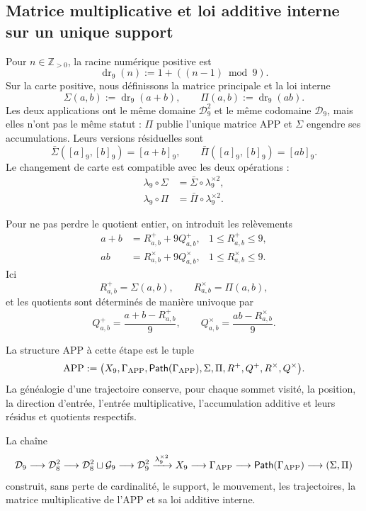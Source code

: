 \subsection{Matrice multiplicative et loi additive interne sur un unique support}

Pour \(n\in\mathbb Z_{>0}\), la racine numérique positive est
\[
 \operatorname{dr}_9(n):=1+((n-1)\bmod9).
\]
Sur la carte positive, nous définissons la matrice principale et la loi interne
\[
 \Sigma(a,b):=\operatorname{dr}_9(a+b),
 \qquad
 \Pi(a,b):=\operatorname{dr}_9(ab).
\]
Les deux applications ont le même domaine \(\mathcal D_9^2\) et le même
codomaine \(\mathcal D_9\), mais elles n’ont pas le même statut : \(\Pi\) publie
l’unique matrice APP et \(\Sigma\) engendre ses accumulations. Leurs versions résiduelles
sont
\[
 \bar\Sigma([a]_9,[b]_9)=[a+b]_9,
 \qquad
 \bar\Pi([a]_9,[b]_9)=[ab]_9.
\]
Le changement de carte est compatible avec les deux opérations :
\begin{align*}
 \lambda_9\circ\Sigma
   &=\bar\Sigma\circ\lambda_9^{\times2},\\
 \lambda_9\circ\Pi
   &=\bar\Pi\circ\lambda_9^{\times2}.
\end{align*}

Pour ne pas perdre le quotient entier, on introduit les relèvements
\begin{align}
 a+b &= R^+_{a,b}+9Q^+_{a,b},
 &1\leq R^+_{a,b}\leq9,
\label{p12-83-c1-s2:eq:app-lift-suma}\\
 ab &= R^\times_{a,b}+9Q^\times_{a,b},
 &1\leq R^\times_{a,b}\leq9.
\label{p12-83-c1-s2:eq:app-lift-producto}
\end{align}
Ici
\[
 R^+_{a,b}=\Sigma(a,b),
 \qquad
 R^\times_{a,b}=\Pi(a,b),
\]
et les quotients sont déterminés de manière univoque par
\[
 Q^+_{a,b}=\frac{a+b-R^+_{a,b}}9,
 \qquad
 Q^\times_{a,b}=\frac{ab-R^\times_{a,b}}9.
\]

\begin{definition}
\label{p12-83-c1-s2:def:app-genealogica-autonoma}
La structure APP à cette étape est le tuple
\[
 \operatorname{APP}:=
 \bigl(
  X_9,
  \Gamma_{\rm APP},
  \mathsf{Path}(\Gamma_{\rm APP}),
  \Sigma,\Pi,
  R^+,Q^+,R^\times,Q^\times
 \bigr).
\]
La généalogie d’une trajectoire conserve, pour chaque sommet visité, la
position, la direction d’entrée, l’entrée multiplicative, l’accumulation
additive et leurs résidus et quotients respectifs.
\end{definition}

\begin{theorem}
\label{p12-83-c1-s2:thm:app-cadena-constructiva-autonoma}
La chaîne
\[
 \mathcal D_9
 \longrightarrow
 \mathcal D_8^2
 \longrightarrow
 \mathcal D_8^2\sqcup\mathcal G_9
 \longrightarrow
 \mathcal D_9^2
 \xrightarrow{\lambda_9^{\times2}}
 X_9
 \longrightarrow
 \Gamma_{\rm APP}
 \longrightarrow
 \mathsf{Path}(\Gamma_{\rm APP})
 \longrightarrow
 (\Sigma,\Pi)
\]
construit, sans perte de cardinalité, le support, le mouvement, les trajectoires,
la matrice multiplicative de l’APP et sa loi additive interne.
\end{theorem}

